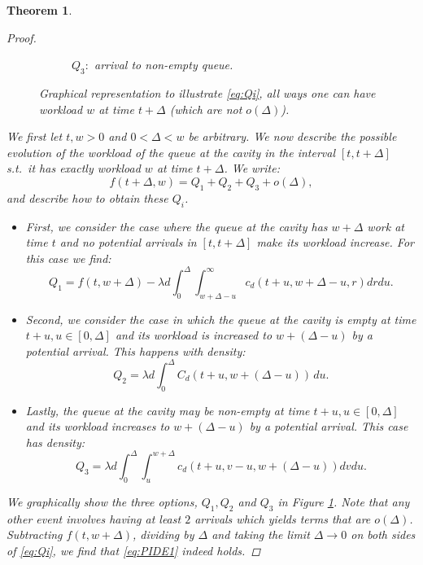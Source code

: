 \documentclass[12pt]{report}
\newtheorem{theorem}{Theorem}
\begin{document}
\begin{theorem}
\begin{proof}
\begin{figure}
\begin{subfigure}{.25\textwidth}
\captionsetup{width=.8\linewidth}
\caption{$Q_3:$ arrival to non-empty queue.}
\end{subfigure}
\caption{Graphical representation to illustrate \eqref{eq:Qi}, all ways one can have workload $w$ at time $t+\Delta$ (which are not $o(\Delta)$).} \label{fig:Q1Q2Q31}
\end{figure}
We first let $t ,w > 0$ and $0 < \Delta < w$ be arbitrary. We now describe the possible evolution of the workload of the queue at the cavity in the interval $[t,t+\Delta]$ s.t.~it has exactly workload $w$ at time $t+\Delta$. We write:
\begin{equation}\label{eq:Qi}
f(t+\Delta, w) = Q_1 + Q_2 + Q_3 + o(\Delta),
\end{equation}
and describe how to obtain these $Q_i$.
\begin{itemize}
\item[($Q_1$)]  First, we consider the case where the queue at the cavity has $w+\Delta$ work at time $t$ and no potential arrivals in $[t,t+\Delta]$ make its workload increase. For this case we find:
$$
Q_1 = f(t,w+\Delta) - \lambda d \int_0^\Delta \int_{w+\Delta-u}^\infty c_d(t+u,w+\Delta-u,r) dr du.
$$
\item[($Q_2$)] Second, we consider the case in which the queue at the cavity is empty at time $t+u, u \in [0,\Delta]$ and its workload is increased to $w+(\Delta-u)$ by a potential arrival. This happens with density:
$$
Q_2 = \lambda d \int_0^\Delta C_d(t+u,w+(\Delta-u))\, du.
$$
\item[($Q_3$)] Lastly, the queue at the cavity may be non-empty at time $t+u, u \in [0,\Delta]$ and its workload increases to $w+(\Delta-u)$ by a potential arrival. This case has density:
$$
Q_3 = \lambda d \int_0^\Delta \int_u^{w+\Delta} c_d(t+u, v-u, w+(\Delta-u)) dv du.
$$
\end{itemize}
We graphically show the three options, $Q_1, Q_2$ and $Q_3$ in Figure \ref{fig:Q1Q2Q31}. Note that any other event involves having at least $2$ arrivals which yields terms that are $o(\Delta)$. Subtracting $f(t,w+\Delta)$, dividing by $\Delta$ and taking the limit $\Delta \rightarrow 0$ on both sides of \eqref{eq:Qi}, we find that \eqref{eq:PIDE1} indeed holds. 


\end{proof}
\end{theorem}
\end{document}
